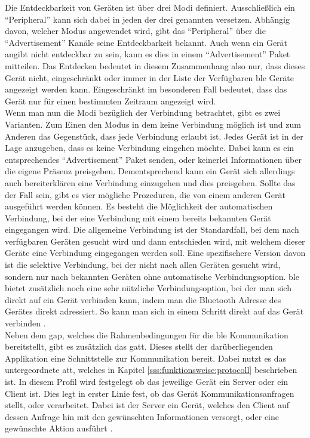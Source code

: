 \noindent Die Entdeckbarkeit von Geräten ist über drei Modi definiert. Ausschließlich ein "`Peripheral"' kann sich dabei in jeden der drei genannten versetzen. Abhängig davon, welcher Modus angewendet wird, gibt das "`Peripheral"' über die "`Advertisement"' Kanäle seine Entdeckbarkeit bekannt. Auch wenn ein Gerät angibt nicht entdeckbar zu sein, kann es dies in einem "`Advertisement"' Paket mitteilen. Das Entdecken bedeutet in diesem Zusammenhang also nur, dass dieses Gerät nicht, eingeschränkt oder immer in der Liste der Verfügbaren \ac{ble} Geräte angezeigt werden kann. Eingeschränkt im besonderen Fall bedeutet, dass das Gerät nur für einen bestimmten Zeitraum angezeigt wird.\\

\noindent Wenn man nun die Modi bezüglich der Verbindung betrachtet, gibt es zwei Varianten. Zum Einen den Modus in dem keine Verbindung möglich ist und zum Anderen das Gegenstück, dass jede Verbindung erlaubt ist. Jedes Gerät ist in der Lage anzugeben, dass es keine Verbindung eingehen möchte. Dabei kann es ein entsprechendes "`Advertisement"' Paket senden, oder keinerlei Informationen über die eigene Präsenz preisgeben. Dementsprechend kann ein Gerät sich allerdings auch bereiterklären eine Verbindung einzugehen und dies preisgeben. Sollte das der Fall sein, gibt es vier mögliche Prozeduren, die von einem anderen Gerät ausgeführt werden können. Es besteht die Möglichkeit der automatischen Verbindung, bei der eine Verbindung mit einem bereits bekannten Gerät eingegangen wird. Die allgemeine Verbindung ist der Standardfall, bei dem nach verfügbaren Geräten gesucht wird und dann entschieden wird, mit welchem dieser Geräte eine Verbindung eingegangen werden soll. Eine spezifischere Version davon ist die selektive Verbindung, bei der nicht nach allen Geräten gesucht wird, sondern nur nach bekannten Geräten ohne automatische Verbindungsoption. \ac{ble} bietet zusätzlich noch eine sehr nützliche Verbindungsoption, bei der man sich direkt auf ein Gerät verbinden kann, indem man die Bluetooth Adresse des Gerätes direkt adressiert. So kann man sich in einem Schritt direkt auf das Gerät verbinden \cite[Seite 38ff]{Townsend14:GSB}.\\      

\noindent Neben dem \ac{gap}, welches die Rahmenbedingungen für die \ac{ble} Kommunikation bereitstellt, gibt es zusätzlich das \ac{gatt}. Dieses stellt der darüberliegenden Applikation eine Schnittstelle zur Kommunikation bereit. Dabei nutzt es das untergeordnete \ac{att}, welches in Kapitel \ref{sss:funktionsweise:protocoll} beschrieben ist. In diesem Profil wird festgelegt ob das jeweilige Gerät ein Server oder ein Client ist. Dies legt in erster Linie fest, ob das Gerät Kommunikationsanfragen stellt, oder verarbeitet. Dabei ist der Server ein Gerät, welches den Client auf dessen Anfrage hin mit den gewünschten Informationen versorgt, oder eine gewünschte Aktion ausführt \cite[Seite 30]{Usama17:BBS}.\\

